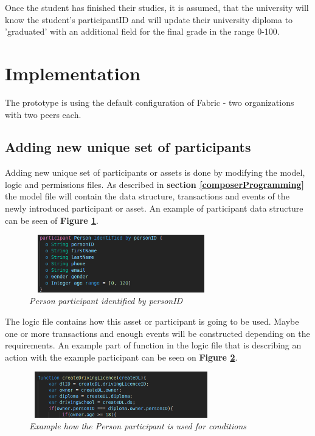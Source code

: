 \documentclass[a4paper,11pt]{report}
\begin{document}
Once the student has finished their studies, it is assumed, that the university will know the student's participantID and will update their university diploma to 'graduated' with an additional field for the final grade in the range 0-100.  

\section{Implementation}

The prototype is using the default configuration of Fabric - two organizations with two peers each.

\subsection{Adding new unique set of participants}
Adding new unique set of participants or assets is done by modifying the model, logic and permissions files. As described in \textbf{section \ref{composerProgramming}} the model file will contain the data structure, transactions and events of the newly introduced participant or asset. An example of participant data structure can be seen of \textbf{Figure \ref{participantModel}}. 

\begin{figure}[h]
\centering
  \includegraphics[height = 2.5cm ,width = 8cm]{participantModel.png}
  \caption{\textit{Person participant identified by personID}}
  \label{participantModel}
\end{figure}

The logic file contains how this asset or participant is going to be used. Maybe one or more transactions and enough events will be constructed depending on the requirements. An example part of function in the logic file that is describing an action with the example participant can be seen on \textbf{Figure \ref{exampleLogic}}. 

\begin{figure}[h]
\centering
  \includegraphics[height = 2cm ,width = 8cm]{owner.png}
  \caption{\textit{Example how the Person participant is used for conditions}}
  \label{exampleLogic}
\end{figure}
\end{document}
